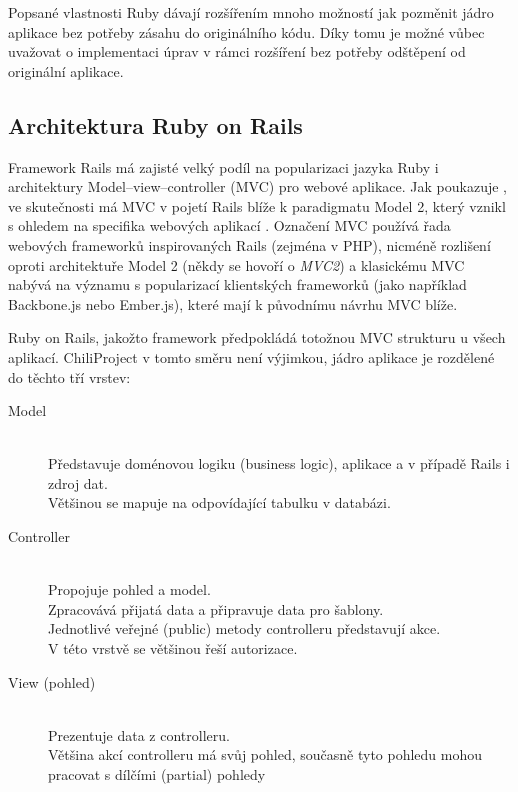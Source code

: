 \documentclass[thesis=B,czech]{FITthesis}[2012/05/02]
\begin{document}
Popsané vlastnosti Ruby dávají rozšířením mnoho možností jak pozměnit jádro
aplikace bez potřeby zásahu do originálního kódu. Díky tomu je možné
vůbec uvažovat o implementaci úprav v rámci rozšíření bez potřeby
odštěpení od originální aplikace.

\subsection{Architektura Ruby on Rails}

Framework Rails má zajisté velký podíl na popularizaci jazyka Ruby i
architektury Model--view--controller (MVC) pro webové aplikace. Jak
poukazuje \citep{Krzywda2011}, ve skutečnosti má MVC v pojetí Rails
blíže k paradigmatu Model 2, který vznikl s ohledem na specifika
webových aplikací \citep{McCallister2004}. Označení MVC používá řada
webových frameworků inspirovaných Rails (zejména v PHP), nicméně
rozlišení oproti architektuře Model 2 (někdy se hovoří o \emph{MVC2}) a
klasickému MVC nabývá na významu s popularizací klientských frameworků
(jako například Backbone.js nebo Ember.js), které mají k původnímu
návrhu MVC blíže.

Ruby on Rails, jakožto  framework \citep[kpt. 4, Make
Opinionated Software]{Fried2009}
předpokládá totožnou MVC strukturu u všech aplikací. ChiliProject
v tomto směru není výjimkou, jádro aplikace je rozdělené do těchto tří vrstev:

\begin{description}
\item[Model] \hfill \\
Představuje doménovou logiku (business logic), aplikace a v případě Rails i zdroj dat. \hfill \\
Většinou se mapuje na odpovídající tabulku v databázi.
\item[Controller] \hfill \\
Propojuje pohled a model. \hfill \\
Zpracovává přijatá data a připravuje data pro šablony. \hfill \\
Jednotlivé veřejné (public) metody controlleru představují akce. \hfill \\
V této vrstvě se většinou řeší autorizace.
\item[View (pohled)] \hfill \\
Prezentuje data z controlleru. \hfill \\
Většina akcí controlleru má svůj pohled, současně tyto pohledu mohou pracovat s dílčími (partial) pohledy
\end{description}
\end{document}
